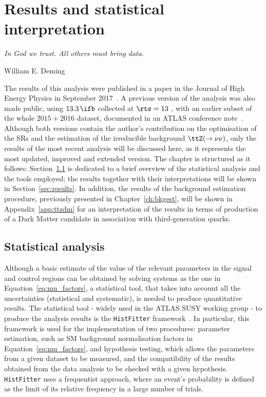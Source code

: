\chapter{Results and statistical interpretation}
\label{ch:results}
\epigraph{\emph{In God we trust. All others must bring data.}}{William E. Deming}

	The results of this analysis were published in a paper in the Journal of High Energy Physics in September 2017~\cite{stop0L}. A previous version of the analysis was also made public, using $13.3\,\ifb$ collected at $\rts = 13$ \TeV, with an earlier subset of the whole $2015+2016$ dataset, documented in an ATLAS conference note~\cite{ICHEPstop0L}. Although both versions contain the author's contribution on the optimisation of the \acp{SR} and the estimation of the irreducible background $\ttZ (\to \nu\nu)$, only the results of the most recent analysis will be discussed here, as it represents the most updated, improved and extended version. The chapter is structured as it follows: Section~\ref{sec:stat_ana} is dedicated to a brief overview of the statistical analysis and the tools employed; the results together with their interpretations will be shown in Section~\ref{sec:results}. In addition, the results of the background estimation procedure, previously presented in Chapter~\ref{ch:bkgest}, will be shown in Appendix~\ref{app:ttzdm} for an interpretation of the results in terms of production of a Dark Matter candidate in association with third-generation quarks.


	\section{Statistical analysis}
	\label{sec:stat_ana}

		Although a basic estimate of the value of the relevant parameters in the signal and control regions can be obtained by solving systems as the one in Equation~\ref{eq:mu_factors}, a statistical tool, that takes into account all the uncertainties (statistical and systematic), is needed to produce quantitative results. The statistical tool - widely used in the ATLAS SUSY working group - to produce the analysis results is the \texttt{HistFitter} framework~\cite{histfitter}. In particular, this framework is used for the implementation of two procedures: parameter estimation, such as \ac{SM} background normalisation factors in Equation~\ref{eq:mu_factors}, and hypothesis testing, which allows the parameters from a given dataset to be measured, and the compatibility of the results obtained from the data analysis to be checked with a given hypothesis. \texttt{HistFitter} uses a frequentist approach, where an event's probability is defined as the limit of its relative frequency in a large number of trials.

